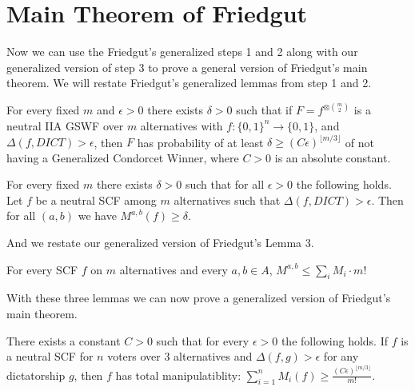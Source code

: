 \section{Main Theorem of Friedgut}

	Now we can use the Friedgut's generalized steps 1 and 2 along with our generalized version of step 3 to prove a general version of Friedgut's main theorem. We will restate Friedgut's generalized lemmas from step 1 and 2.

	\begin{lemma}
		\label{friedgut-lemma-1}
		For every fixed $m$ and $\epsilon > 0$ there exists $\delta > 0$ such that if $F = f^{\otimes \binom{m}{2}}$ is a neutral IIA GSWF over $m$ alternatives with $f : \{0,1\}^n \rightarrow \{0,1\}$, and $\Delta(f, DICT) > \epsilon$, then $F$ has probability of at least $\delta \ge (C\epsilon)^{\lfloor m/3 \rfloor}$ of not having a Generalized Condorcet Winner, where $C > 0$ is an absolute constant.
	\end{lemma}

	\begin{lemma}
		\label{friedgut-lemma-2}
		For every fixed $m$ there exists $\delta > 0$ such that for all $\epsilon > 0$ the following holds. Let $f$ be a neutral SCF among $m$ alternatives such that $\Delta(f, DICT) > \epsilon$. Then for all $(a,b)$ we have $M^{a,b}(f) \ge \delta$.
	\end{lemma}

	And we restate our generalized version of Friedgut's Lemma 3.

	\begin{lemma}
		\label{friedgut-lemma-3}
		For every SCF $f$ on $m$ alternatives and every $a,b \in A$, $M^{a,b} \le \sum_i M_i \cdot m!$
	\end{lemma}

	With these three lemmas we can now prove a generalized version of Friedgut's main theorem.

	\begin{theorem}
		There exists a constant $C > 0$ such that for every $\epsilon > 0$ the following holds. If $f$ is a neutral SCF for $n$ voters over 3 alternatives and $\Delta(f, g) > \epsilon$ for any dictatorship $g$, then $f$ has total manipulatiblity: $\sum^n_{i=1} M_i(f) \ge \frac{(C\epsilon)^{\lfloor m/3 \rfloor}}{m!}$.
	\end{theorem}

